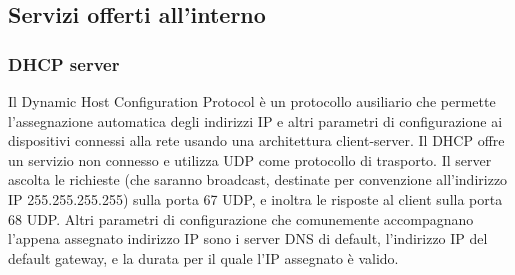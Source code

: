 \subsection{Servizi offerti all'interno}
\subsubsection{DHCP server}
Il Dynamic Host Configuration Protocol \cite[RFC2131]{RFC2131} è un protocollo ausiliario che permette l'assegnazione automatica degli indirizzi IP e altri parametri di configurazione ai dispositivi connessi alla rete usando una architettura client-server.
Il DHCP offre un servizio non connesso e utilizza UDP come protocollo di trasporto. Il server ascolta le richieste (che saranno broadcast, destinate per convenzione all'indirizzo IP 255.255.255.255) sulla porta 67 UDP, e inoltra le risposte al client sulla porta 68 UDP.
Altri parametri di configurazione che comunemente accompagnano l'appena assegnato indirizzo IP sono i server DNS \cite[RFC1034]{RFC1034} di default, l'indirizzo IP del default gateway, e la durata per il quale l'IP assegnato è valido.

